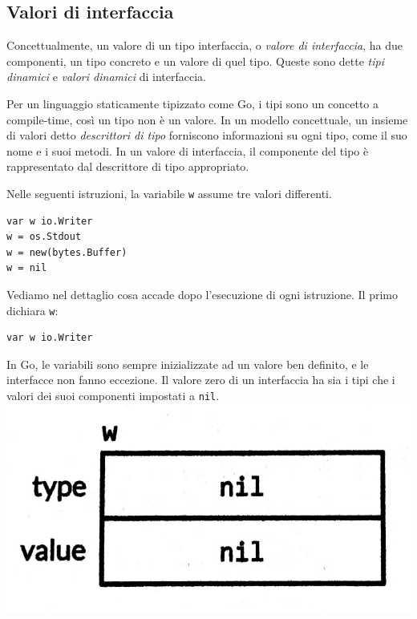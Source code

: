 \documentclass[../../thesis.tex]{subfiles}
\begin{document}
    \subsection{Valori di interfaccia}\label{subsec:valori-di-interfaccia}
    Concettualmente, un valore di un tipo interfaccia, o \textit{valore di interfaccia}, ha due componenti, un tipo concreto e un valore di quel tipo.
    Queste sono dette \textit{tipi dinamici} e \textit{valori dinamici} di interfaccia.
    \hfill \vspace{12pt}

    Per un linguaggio staticamente tipizzato come Go, i tipi sono un concetto a compile-time, così un tipo non è un valore.
    In un modello concettuale, un insieme di valori detto \textit{descrittori di tipo} forniscono informazioni su ogni tipo, come il suo nome e i suoi metodi.
    In un valore di interfaccia, il componente del tipo è rappresentato dal descrittore di tipo appropriato.
    \hfill \vspace{12pt}

    Nelle seguenti istruzioni, la variabile \verb"w" assume tre valori differenti.
    \begin{lstlisting}[frame = single,label={lst:lstlisting6-5.1}]
var w io.Writer
w = os.Stdout
w = new(bytes.Buffer)
w = nil
    \end{lstlisting}
    Vediamo nel dettaglio cosa accade dopo l'esecuzione di ogni istruzione.
    Il primo dichiara \verb"w":
    \begin{lstlisting}[frame = single,label={lst:lstlisting6-5.2}]
var w io.Writer
    \end{lstlisting}
    In Go, le variabili sono sempre inizializzate ad un valore ben definito, e le interfacce non fanno eccezione.
    Il valore zero di un interfaccia ha sia i tipi che i valori dei suoi componenti impostati a \verb"nil".
    \center\includegraphics[scale = 0.125]{figura-7.1}
\end{document}
